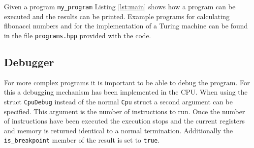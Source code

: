 Given a program \lstinline{my_program} Listing \ref{lst:main} shows how a program can be
executed and the results can be printed. Example programs for calculating fibonacci numbers
and for the implementation of a Turing machine can be found in the file \texttt{programs.hpp} provided with the code.



\subsection{Debugger}
For more complex programs it is important to be able to debug the program. For this
a debugging mechanism has been implemented in the CPU. When using the struct 
\lstinline{CpuDebug} instead of the normal \lstinline{Cpu} struct a second argument
can be specified. This argument is the number of instructions to run. Once the number
of instructions have been executed the execution stops and the current registers and
memory is returned identical to a normal termination. Additionally the \lstinline{is_breakpoint} member of the result is set to \lstinline{true}.


